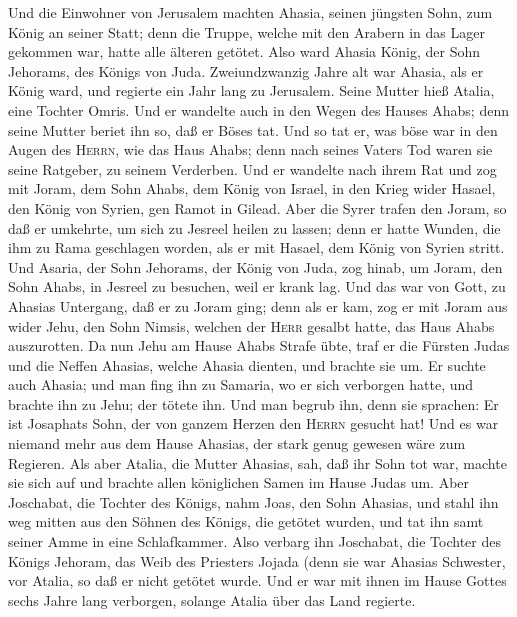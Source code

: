  Und die Einwohner von Jerusalem machten Ahasia, seinen
jüngsten Sohn, zum König an seiner Statt; denn die Truppe, welche mit
den Arabern in das Lager gekommen war, hatte alle älteren getötet. Also
ward Ahasia König, der Sohn Jehorams, des Königs von Juda.
 Zweiundzwanzig Jahre alt war Ahasia, als er König ward,
und regierte ein Jahr lang zu Jerusalem. Seine Mutter hieß Atalia, eine
Tochter Omris.  Und er wandelte auch in den Wegen des
Hauses Ahabs; denn seine Mutter beriet ihn so, daß er Böses tat.
 Und so tat er, was böse war in den Augen des
\textsc{Herrn}, wie das Haus Ahabs; denn nach seines Vaters Tod waren
sie seine Ratgeber, zu seinem Verderben.  Und er wandelte
nach ihrem Rat und zog mit Joram, dem Sohn Ahabs, dem König von Israel,
in den Krieg wider Hasael, den König von Syrien, gen Ramot in Gilead.
 Aber die Syrer trafen den Joram, so daß er umkehrte, um
sich zu Jesreel heilen zu lassen; denn er hatte Wunden, die ihm zu Rama
geschlagen worden, als er mit Hasael, dem König von Syrien stritt. Und
Asaria, der Sohn Jehorams, der König von Juda, zog hinab, um Joram, den
Sohn Ahabs, in Jesreel zu besuchen, weil er krank lag. 
Und das war von Gott, zu Ahasias Untergang, daß er zu Joram ging; denn
als er kam, zog er mit Joram aus wider Jehu, den Sohn Nimsis, welchen
der \textsc{Herr} gesalbt hatte, das Haus Ahabs auszurotten.
 Da nun Jehu am Hause Ahabs Strafe übte, traf er die
Fürsten Judas und die Neffen Ahasias, welche Ahasia dienten, und brachte
sie um.  Er suchte auch Ahasia; und man fing ihn zu
Samaria, wo er sich verborgen hatte, und brachte ihn zu Jehu; der tötete
ihn. Und man begrub ihn, denn sie sprachen: Er ist Josaphats Sohn, der
von ganzem Herzen den \textsc{Herrn} gesucht hat! Und es war niemand
mehr aus dem Hause Ahasias, der stark genug gewesen wäre zum Regieren.
 Als aber Atalia, die Mutter Ahasias, sah, daß ihr Sohn
tot war, machte sie sich auf und brachte allen königlichen Samen im
Hause Judas um.  Aber Joschabat, die Tochter des Königs,
nahm Joas, den Sohn Ahasias, und stahl ihn weg mitten aus den Söhnen des
Königs, die getötet wurden, und tat ihn samt seiner Amme in eine
Schlafkammer. Also verbarg ihn Joschabat, die Tochter des Königs
Jehoram, das Weib des Priesters Jojada (denn sie war Ahasias Schwester,
vor Atalia, so daß er nicht getötet wurde.  Und er war
mit ihnen im Hause Gottes sechs Jahre lang verborgen, solange Atalia
über das Land regierte.

